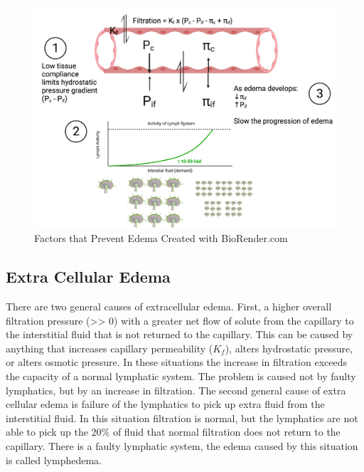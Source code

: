\begin{figure}[!h]
    \centering
    \includegraphics[width=1\linewidth]{./figure/Factors_Prevent_Edema.png}
    \caption{Factors that Prevent Edema \footnotesize{Created with BioRender.com}}
    \label{fig:Factors_Prevent_Edema}
\end{figure}

\subsection{Extra Cellular Edema}

There are two general causes of extracellular edema. First, a higher overall filtration pressure (>> 0) with a greater net flow of solute from the capillary to the interstitial fluid that is not returned to the capillary. This can be caused by anything that increases capillary permeability ($K_f$), alters hydrostatic pressure, or alters osmotic pressure. In these situations the increase in filtration exceeds the capacity of a normal lymphatic system. The problem is caused not by faulty lymphatics, but by an increase in filtration.
The second general cause of extra cellular edema is failure of the lymphatics to pick up extra fluid from the interstitial fluid. In this situation filtration is normal, but the lymphatics are not able to pick up the 20\% of fluid that normal filtration does not return to the capillary. There is a faulty lymphatic system, the edema caused by this situation is called lymphedema.

